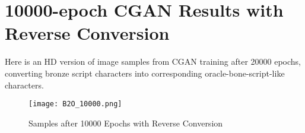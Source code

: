 \chapter{10000-epoch CGAN Results with Reverse Conversion}\label{ch:appendix_5}
Here is an HD version of image samples from CGAN training after 20000 epochs, converting bronze script characters into corresponding oracle-bone-script-like characters.
\begin{figure}[h]
	\centering
	\texttt{[image: B2O\_10000.png]}
	\caption{\label{fig:B2O_10000} Samples after 10000 Epochs with Reverse Conversion}
\end{figure}